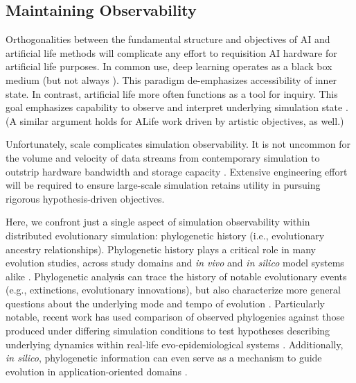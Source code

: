 \subsection{Maintaining Observability}

Orthogonalities between the fundamental structure and objectives of AI and artificial life methods will complicate any effort to requisition AI hardware for artificial life purposes.
In common use, deep learning operates as a black box medium \citep{loyola2019black} (but not always \citep{mahendran2015understanding}).
This paradigm de-emphasizes accessibility of inner state.
In contrast, artificial life more often functions as a tool for inquiry.
This goal emphasizes capability to observe and interpret underlying simulation state \citep{moreno2023toward,horgan1995complexity}.
(A similar argument holds for ALife work driven by artistic objectives, as well.)

Unfortunately, scale complicates simulation observability.
It is not uncommon for the volume and velocity of data streams from contemporary simulation to outstrip hardware bandwidth and storage capacity \citep{osti_1770192}.
Extensive engineering effort will be required to ensure large-scale simulation retains utility in pursuing rigorous hypothesis-driven objectives.

Here, we confront just a single aspect of simulation observability within distributed evolutionary simulation: phylogenetic history (i.e., evolutionary ancestry relationships).
Phylogenetic history plays a critical role in many evolution studies, across study domains and \textit{in vivo} and \textit{in silico} model systems alike \citep{faithConservationEvaluationPhylogenetic1992,STAMATAKIS2005phylogenetics,frenchHostPhylogenyShapes2023,kim2006discovery,lewinsohnStatedependentEvolutionaryModels2023a,lenski2003evolutionary,moreno2021case}.
Phylogenetic analysis can trace the history of notable evolutionary events (e.g., extinctions, evolutionary innovations), but also characterize more general questions about the underlying mode and tempo of evolution \citep{moreno2023toward,hernandez2022can,shahbandegan2022untangling,lewinsohnStatedependentEvolutionaryModels2023a}.
Particularly notable, recent work has used comparison of observed phylogenies against those produced under differing simulation conditions to test hypotheses describing underlying dynamics within real-life evo-epidemiological systems \citep{giardina2017inference,voznica2022deep}.
Additionally, \textit{in silico}, phylogenetic information can even serve as a mechanism to guide evolution in application-oriented domains \citep{lalejini2024phylogeny,lalejini2024runtime,murphy2008simple,burke2003increased}.

